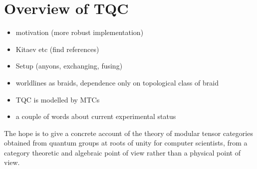 \section{Overview of TQC}

\begin{itemize}
\item motivation (more robust implementation)
    \item Kitaev etc (find references)
    \item Setup (anyons, exchanging, fusing)
    \item worldlines as braids, dependence only on topological class of braid
    \item TQC is modelled by MTCs
    \item a couple of words about current experimental status
\end{itemize}
%
%
%
%
%
%


%
%
%
%
%
The hope is to give a concrete account of the theory of modular tensor
categories obtained from quantum groups at roots of unity for computer
scientists, from a category theoretic and algebraic point of view rather than a
physical point of view. 

